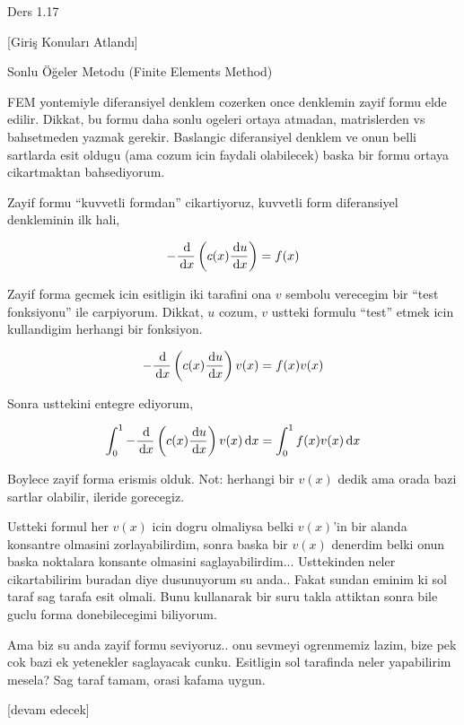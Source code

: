 \documentclass[12pt,fleqn]{article}\usepackage{../../common}
\begin{document}
Ders 1.17

[Giriş Konuları Atlandı]

Sonlu Öğeler Metodu (Finite Elements Method)

FEM yontemiyle diferansiyel denklem cozerken once denklemin zayif formu elde
edilir. Dikkat, bu formu daha sonlu ogeleri ortaya atmadan, matrislerden vs
bahsetmeden yazmak gerekir. Baslangic diferansiyel denklem ve onun belli
sartlarda esit oldugu (ama cozum icin faydali olabilecek) baska bir formu
ortaya cikartmaktan bahsediyorum. 

Zayif formu ``kuvvetli formdan'' cikartiyoruz, kuvvetli form diferansiyel
denkleminin ilk hali,

$$
- \frac{\,\mathrm{d}}{\,\mathrm{d} x} \left( c(x) \frac{\,\mathrm{d} u}{\,\mathrm{d} x} \right) = f(x)
$$

Zayif forma gecmek icin esitligin iki tarafini ona $v$ sembolu verecegim bir
``test fonksiyonu'' ile carpiyorum. Dikkat, $u$ cozum, $v$ ustteki formulu
``test'' etmek icin kullandigim herhangi bir fonksiyon. 

$$
- \frac{\,\mathrm{d}}{\,\mathrm{d} x} \left( c(x) \frac{\,\mathrm{d} u}{\,\mathrm{d} x} \right) v(x) =
f(x) v(x)
$$

Sonra usttekini entegre ediyorum,

$$
\int_{0}^{1} - \frac{\,\mathrm{d}}{\,\mathrm{d} x} \left( c(x) \frac{\,\mathrm{d} u}{\,\mathrm{d} x} \right) v(x) \,\mathrm{d} x=
\int_{0}^{1} f(x) v(x) \,\mathrm{d} x
$$

Boylece zayif forma erismis olduk. Not: herhangi bir $v(x)$ dedik ama orada
bazi sartlar olabilir, ileride gorecegiz. 

Ustteki formul her $v(x)$ icin dogru olmaliysa belki $v(x)$'in bir alanda
konsantre olmasini zorlayabilirdim, sonra baska bir $v(x)$ denerdim belki onun
baska noktalara konsante olmasini saglayabilirdim... Usttekinden neler
cikartabilirim buradan diye dusunuyorum su anda.. Fakat sundan eminim ki sol
taraf sag tarafa esit olmali. Bunu kullanarak bir suru takla attiktan sonra bile
guclu forma donebilecegimi biliyorum.

Ama biz su anda zayif formu seviyoruz.. onu sevmeyi ogrenmemiz lazim, bize
pek cok bazi ek yetenekler saglayacak cunku. Esitligin sol tarafinda neler
yapabilirim mesela? Sag taraf tamam, orasi kafama uygun. 







[devam edecek]
\end{document}
